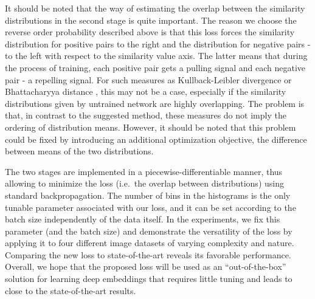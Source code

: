It should be noted that the way of estimating the overlap between the similarity distributions in the second stage is quite important. The reason we choose the reverse order probability described above is that this loss forces the similarity distribution for positive pairs to the right and the distribution for negative pairs - to the left with respect to the similarity value axis. The latter means that during the process of training, each positive pair gets a pulling signal and each negative pair - a repelling signal. For such measures as Kullback-Leibler divergence \citep{kullback1951information} or Bhattacharyya distance \citep{bhattacharyya1943measure}, this may not be a case, especially if the similarity distributions given by untrained network are highly overlapping. The problem is that, in contrast to the suggested method, these measures do not imply the ordering of distribution means. However, it should be noted that this problem could be fixed by introducing an additional optimization objective, \eg{} the difference between means of the two distributions. 



The two stages are implemented in a piecewise-differentiable manner, thus allowing to minimize the loss (i.e.\ the overlap between distributions) using standard backpropagation.
The number of bins in the histograms is the only tunable parameter associated with our loss, and it can be set according to the batch size independently of the data itself. In the experiments, we fix this parameter (and the batch size) and demonstrate the versatility of the loss by applying it to four different image datasets of varying complexity and nature. Comparing the new loss to state-of-the-art reveals its favorable performance. Overall, we hope that the proposed loss will be used as an ``out-of-the-box'' solution for learning deep embeddings that requires little tuning and leads to close to the state-of-the-art results.





